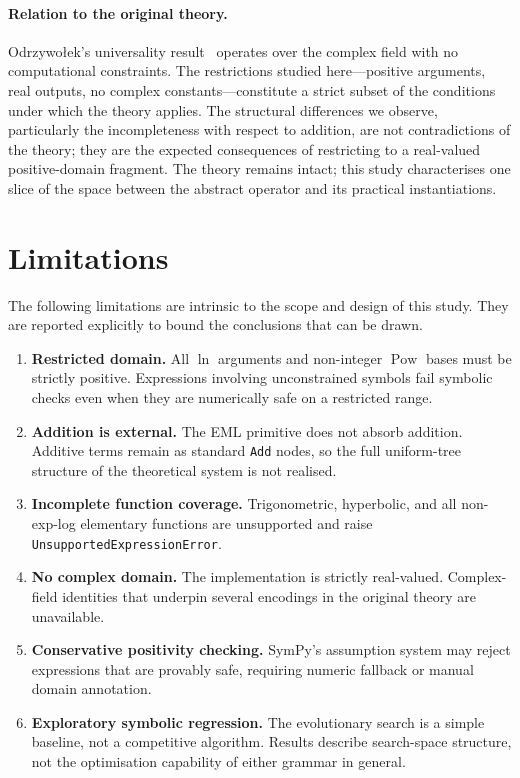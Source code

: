 \documentclass[11pt,a4paper]{article}
\newcommand{\lnf}{\operatorname{ln}}
\begin{document}
\paragraph{Relation to the original theory.}
Odrzywołek's universality result~\cite{odrzywolek2026eml} operates over the
complex field with no computational constraints. The restrictions studied
here---positive arguments, real outputs, no complex constants---constitute
a strict subset of the conditions under which the theory applies. The
structural differences we observe, particularly the incompleteness with
respect to addition, are not contradictions of the theory; they are the
expected consequences of restricting to a real-valued positive-domain
fragment. The theory remains intact; this study characterises one slice
of the space between the abstract operator and its practical instantiations.

\section{Limitations}
\label{sec:limitations}

The following limitations are intrinsic to the scope and design of this
study. They are reported explicitly to bound the conclusions that can be
drawn.

\begin{enumerate}
  \item \textbf{Restricted domain.} All $\lnf$ arguments and non-integer
        $\operatorname{Pow}$ bases must be strictly positive. Expressions
        involving unconstrained symbols fail symbolic checks even when they
        are numerically safe on a restricted range.
  \item \textbf{Addition is external.} The EML primitive does not absorb
        addition. Additive terms remain as standard \texttt{Add} nodes,
        so the full uniform-tree structure of the theoretical system is
        not realised.
  \item \textbf{Incomplete function coverage.} Trigonometric, hyperbolic,
        and all non-exp-log elementary functions are unsupported and raise
        \texttt{UnsupportedExpressionError}.
  \item \textbf{No complex domain.} The implementation is strictly
        real-valued. Complex-field identities that underpin several
        encodings in the original theory are unavailable.
  \item \textbf{Conservative positivity checking.} SymPy's assumption
        system may reject expressions that are provably safe, requiring
        numeric fallback or manual domain annotation.
  \item \textbf{Exploratory symbolic regression.} The evolutionary search
        is a simple baseline, not a competitive algorithm. Results describe
        search-space structure, not the optimisation capability of either
        grammar in general.
\end{enumerate}
\end{document}
